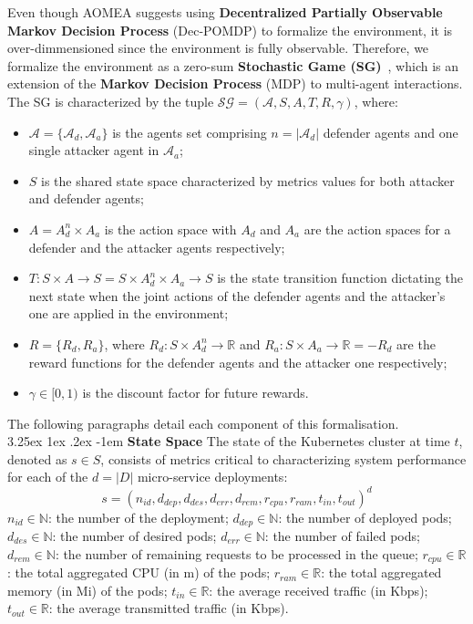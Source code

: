 \documentclass[conference]{IEEEtran}
\makeatletter
\renewcommand\paragraph{\@startsection{paragraph}{5}{\z@}%
  {3.25ex \@plus1ex \@minus.2ex}%
  {-1em}%
  {\normalfont\normalsize\bfseries}}
\makeatother
\begin{document}
Even though AOMEA suggests using \textbf{Decentralized Partially Observable Markov Decision Process} (Dec-POMDP) to formalize the environment, it is over-dimmensioned since the environment is fully observable. Therefore, we formalize the environment as a zero-sum \textbf{Stochastic Game (SG)}~\cite{shapley1953stochastic}, which is an extension of the \textbf{Markov Decision Process} (MDP) to multi-agent interactions. The SG is characterized by the tuple $\mathcal{SG} = (\mathcal{A}, S, A, T, R, \gamma)$, where:

\begin{itemize}
  \item $\mathcal{A} = \{\mathcal{A}_d, \mathcal{A}_a\}$ is the agents set comprising $n = |\mathcal{A}_d|$ defender agents and one single attacker agent in $\mathcal{A}_a$;
  \item $S$ is the shared state space characterized by metrics values for both attacker and defender agents;
  \item $A = A_d^n \times A_a$ is the action space with $A_d$ and $A_a$ are the action spaces for a defender and the attacker agents respectively;
  \item $T: S \times A \rightarrow S = S \times A_d^n \times A_a \to S$ is the state transition function dictating the next state when the joint actions of the defender agents and the attacker's one are applied in the environment;
  \item $R = \{R_d, R_a\}$, where $R_d: S \times A_d^n \to \mathbb{R}$ and $R_a: S \times A_a \to \mathbb{R} = - R_d$ are the reward functions for the defender agents and the attacker one respectively;
  \item $\gamma \in [0, 1)$ is the discount factor for future rewards.
\end{itemize}

The following paragraphs detail each component of this formalisation.\\

\noindent \paragraph{\textbf{State Space}} The state of the Kubernetes cluster at time $t$, denoted as $s \in S$, consists of metrics critical to characterizing system performance for each of the $d = |D|$ micro-service deployments:
$$
s = (n_{id}, d_{dep}, d_{des}, d_{err}, d_{rem}, r_{cpu}, r_{ram}, t_{in}, t_{out})^d
$$
$n_{id} \in \mathbb{N}$: the number of the deployment; \quad
$d_{dep} \in \mathbb{N}$: the number of deployed pods; \quad 
$d_{des} \in \mathbb{N}$: the number of desired pods; \quad
$d_{err} \in \mathbb{N}$: the number of failed pods; \quad
$d_{rem} \in \mathbb{N}$: the number of remaining requests to be processed in the queue; \quad
$r_{cpu} \in \mathbb{R}$: the total aggregated CPU (in m) of the pods; \quad
$r_{ram} \in \mathbb{R}$: the total aggregated memory (in Mi) of the pods; \quad
$t_{in} \in \mathbb{R}$: the average received traffic (in Kbps); \quad
$t_{out} \in \mathbb{R}$: the average transmitted traffic (in Kbps).
\end{document}
